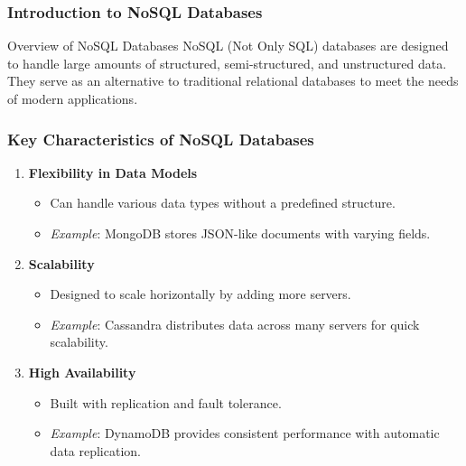 \documentclass[aspectratio=169]{beamer}
\begin{document}
\begin{frame}[fragile]
    \frametitle{Introduction to NoSQL Databases}
    \begin{block}{Overview of NoSQL Databases}
        NoSQL (Not Only SQL) databases are designed to handle large amounts of structured, semi-structured, and unstructured data. They serve as an alternative to traditional relational databases to meet the needs of modern applications.
    \end{block}
\end{frame}

\begin{frame}[fragile]
    \frametitle{Key Characteristics of NoSQL Databases}
    \begin{enumerate}
        \item \textbf{Flexibility in Data Models}
            \begin{itemize}
                \item Can handle various data types without a predefined structure.
                \item \textit{Example}: MongoDB stores JSON-like documents with varying fields.
            \end{itemize}

        \item \textbf{Scalability}
            \begin{itemize}
                \item Designed to scale horizontally by adding more servers.
                \item \textit{Example}: Cassandra distributes data across many servers for quick scalability.
            \end{itemize}

        \item \textbf{High Availability}
            \begin{itemize}
                \item Built with replication and fault tolerance.
                \item \textit{Example}: DynamoDB provides consistent performance with automatic data replication.
            \end{itemize}
    \end{enumerate}
\end{frame}
\end{document}
